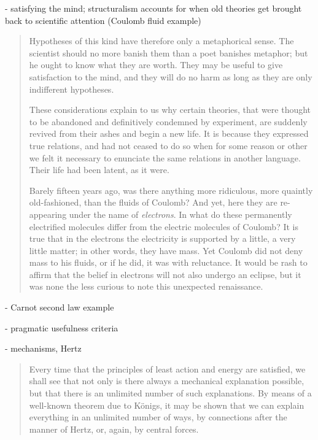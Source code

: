   - satisfying the mind; structuralism accounts for when old theories get brought back to scientific attention (Coulomb fluid example)
 
 \begin{quote}
     Hypotheses of this kind have therefore only a metaphorical sense.  The scientist should no more banish them than a poet banishes metaphor; but he ought to know what they are worth.  They may be useful to give satisfaction to the mind, and they will do no harm as long as they are only indifferent hypotheses.  
     
     These considerations explain to us why certain theories, that were thought to be abandoned and definitively condemned by experiment, are suddenly revived from their ashes and begin a new life.  It is because they expressed true relations, and had not ceased to do so when for some reason or other we felt it necessary to enunciate the same relations in another language.  Their life had been latent, as it were.  
     
     Barely fifteen years ago, was there anything more ridiculous, more quaintly old-fashioned, than the fluids of Coulomb?  And yet, here they are re-appearing under the name of \emph{electrons}.  In what do these permanently electrified molecules differ from the electric molecules of Coulomb?  It is true that in the electrons the electricity is supported by a little, a very little matter; in other words, they have mass.  Yet Coulomb did not deny mass to his fluids, or if he did, it was with reluctance.  It would be rash to affirm that the belief in electrons will not also undergo an eclipse, but it was none the less curious to note this unexpected renaissance.
     
     \citep[p. 164-165]{Poincare1952}
 \end{quote}
 
- Carnot second law example
 
 - pragmatic usefulness criteria
 
 - mechanisms, Hertz
 
 \begin{quote}
     Every time that the principles of least action and energy are satisfied, we shall see that not only is there always a mechanical explanation possible, but that there is an unlimited number of such explanations.  By means of a well-known theorem due to K\"onigs, it may be shown that we can explain everything in an unlimited number of ways, by connections after the manner of Hertz, or, again, by central forces.  \citep[p. 167-168]{Poincare1952}
 \end{quote}
 
